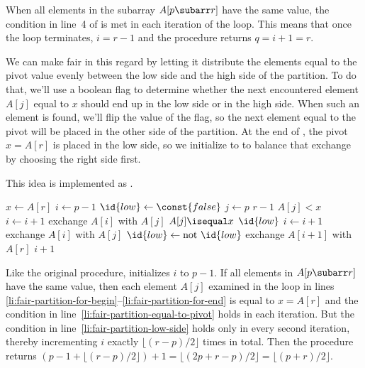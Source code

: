 When all elements in the subarray $A[p\subarr r]$ have the same value, the condition in line~4 of  is met in each iteration of the  loop.
This means that once the loop terminates, $i=r-1$ and the procedure returns $q=i+1=r$.

We can make  fair in this regard by letting it distribute the elements equal to the pivot value evenly between the low side and the high side of the partition.
To do that, we'll use a boolean flag  to determine whether the next encountered element $A[j]$ equal to $x$ should end up in the low side or in the high side.
When such an element is found, we'll flip the value of the flag, so the next element equal to the pivot will be placed in the other side of the partition.
At the end of , the pivot $x=A[r]$ is placed in the low side, so we initialize  to  to balance that exchange by choosing the right side first.

This idea is implemented as .

\begin{codebox}
\li $x\gets A[r]$
\li $i\gets p-1$
\li $\id{low}\gets\const{false}$
\li \For $j\gets p$ \To $r-1$ \label{li:fair-partition-for-begin}
\li     \Do
            \If $A[j]<x$
\li             \Then
                    $i\gets i+1$
\li                 exchange $A[i]$ with $A[j]$
\li             \ElseIf $A[j]\isequal x$ \label{li:fair-partition-equal-to-pivot}
\li                 \Then
                        \If $\id{low}$ \label{li:fair-partition-low-side}
\li                         \Then
                                $i\gets i+1$
\li                             exchange $A[i]$ with $A[j]$
                            \End
\li                     $\id{low}\gets\text{not }\id{low}$ \>\>\>\>
                    \End
        \End \label{li:fair-partition-for-end}
\li exchange $A[i+1]$ with $A[r]$
\li \Return $i+1$
\end{codebox}

Like the original procedure,  initializes $i$ to $p-1$.
If all elements in $A[p\subarr r]$ have the same value, then each element $A[j]$ examined in the  loop in lines \ref{li:fair-partition-for-begin}--\ref{li:fair-partition-for-end} is equal to $x=A[r]$ and the condition in line~\ref{li:fair-partition-equal-to-pivot} holds in each iteration.
But the condition in line~\ref{li:fair-partition-low-side} holds only in every second iteration, thereby incrementing $i$ exactly $\lfloor(r-p)/2\rfloor$ times in total.
Then the procedure returns $(p-1+\lfloor(r-p)/2\rfloor)+1=\lfloor(2p+r-p)/2\rfloor=\lfloor(p+r)/2\rfloor$.
